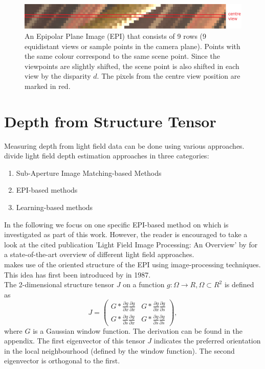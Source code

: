 \documentclass  [
  paper    = a4,
  BCOR     = 10mm,
  twoside,
  fontsize = 12pt,
  fleqn,
  toc      = bibnumbered,
  toc      = listofnumbered,
  numbers  = noendperiod,
  headings = normal,
  listof   = leveldown,
  version  = 3.03
]                                       {scrreprt}
\begin{document}
\begin{figure}
	\centering
	\includegraphics[width=1\linewidth]{images/simple_epi}
	\caption[Example Epipolar Plane image]{An Epipolar Plane Image (EPI) that consists of 9 rows (9 equidistant views or sample points in the camera plane). Points with the same colour correspond to the same scene point. Since the viewpoints are slightly shifted, the scene point is also shifted in each view by the disparity $d$. The pixels from the centre view position are marked in red.}
	\label{fig:simpleepi}
\end{figure}


\section{Depth from Structure Tensor}
Measuring depth from light field data can be done using various approaches.
\cite{wu2017light} divide light field depth estimation approaches in three categories:
\begin{enumerate}
	\item Sub-Aperture Image Matching-based Methods
	\item EPI-based methods
	\item Learning-based methods
\end{enumerate}
In the following we focus on one specific EPI-based method on which is investigated as part of this work. However, the reader is encouraged to take a look at the cited publication 'Light Field Image Processing: An Overview' by \cite{wu2017light} for a state-of-the-art overview of different light field approaches.\\
\cite{wanner2014orientation} makes use of the oriented structure of the EPI using image-processing techniques. This idea has first been introduced by \cite{bigun1987optimal} in 1987.\\

The 2-dimensional structure tensor $J$  on a function $g:\Omega \rightarrow \!R, \Omega \subset \!R^2 $ is defined as
\begin{equation}\label{eq:structuretensor}
J =\left(
\begin{matrix}
G*\frac{\partial g}{\partial x}\frac{\partial g}{\partial x} & G*\frac{\partial g}{\partial x}\frac{\partial g}{\partial s} \\
G*\frac{\partial g}{\partial s}\frac{\partial g}{\partial x} & G*\frac{\partial g}{\partial s}\frac{\partial g}{\partial s} 
\end{matrix}\right),
\end{equation}
 where $G$ is a Gaussian window function. The derivation can be found in the appendix.
 The first eigenvector of this tensor $J$ indicates the preferred orientation in the local neighbourhood (defined by the window function). The second eigenvector is orthogonal to the first. 
 
\end{document}
